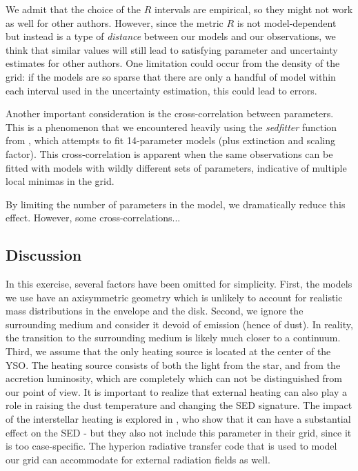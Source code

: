 We admit that the choice of the $R$ intervals are empirical, so they might not work as well for other authors. However, since the metric $R$ is not model-dependent but instead is a type of \textit{distance} between our models and our observations, we think that similar values will still lead to satisfying parameter and uncertainty estimates for other authors. One limitation could occur from the density of the grid: if the models are so sparse that there are only a handful of model within each interval used in the uncertainty estimation, this could lead to errors. 


Another important consideration is the cross-correlation between parameters. This is a phenomenon that we encountered heavily using the \textit{sedfitter} function from \citet{Robitaille:2006cb}, which attempts to fit 14-parameter models (plus extinction and scaling factor). This cross-correlation is apparent when the same observations can be fitted with models with wildly different sets of parameters, indicative of multiple local minimas in the grid.

By limiting the number of parameters in the model, we dramatically reduce this effect. However, some cross-correlations...



\subsection{Discussion}

In this exercise, several factors have been omitted for simplicity. First, the models we use have an axisymmetric geometry which is unlikely to account for realistic mass distributions in the envelope and the disk. Second, we ignore the surrounding medium and consider it devoid of emission (hence of dust). In reality, the transition to the surrounding medium is likely much closer to a continuum. Third, we assume that the only heating source is located at the center of the YSO. The heating source consists of both the light from the star, and from the accretion luminosity, which are completely which can not be distinguished from our point of view. It is important to realize that external heating can also play a role in raising the dust temperature and changing the SED signature. The impact of the interstellar heating is explored in \citet{Furlan:2016df}, who show that it can have a substantial effect on the SED - but they also not include this parameter in their grid, since it is too case-specific. The hyperion radiative transfer code that is used to model our grid can accommodate for external radiation fields as well. 

